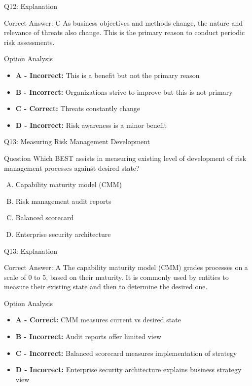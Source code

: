 \documentclass{beamer}
\begin{document}
	\begin{frame}{Q12: Explanation}
		\begin{block}{Correct Answer: C}
			As business objectives and methods change, the nature and relevance of threats also change. This is the primary reason to conduct periodic risk assessments.
		\end{block}
		\begin{block}{Option Analysis}
			\begin{itemize}
				\item \textbf{A - Incorrect:} This is a benefit but not the primary reason
				\item \textbf{B - Incorrect:} Organizations strive to improve but this is not primary
				\item \textbf{C - Correct:} Threats constantly change
				\item \textbf{D - Incorrect:} Risk awareness is a minor benefit
			\end{itemize}
		\end{block}
	\end{frame}
	
	\begin{frame}[shrink=10]{Q13: Measuring Risk Management Development}
		\begin{block}{Question}
			Which BEST assists in measuring existing level of development of risk management processes against desired state?
		\end{block}
		\begin{enumerate}[(A)]
			\item Capability maturity model (CMM)
			\item Risk management audit reports
			\item Balanced scorecard
			\item Enterprise security architecture
		\end{enumerate}
	\end{frame}
	
	\begin{frame}{Q13: Explanation}
		\begin{block}{Correct Answer: A}
			The capability maturity model (CMM) grades processes on a scale of 0 to 5, based on their maturity. It is commonly used by entities to measure their existing state and then to determine the desired one.
		\end{block}
		\begin{block}{Option Analysis}
			\begin{itemize}
				\item \textbf{A - Correct:} CMM measures current vs desired state
				\item \textbf{B - Incorrect:} Audit reports offer limited view
				\item \textbf{C - Incorrect:} Balanced scorecard measures implementation of strategy
				\item \textbf{D - Incorrect:} Enterprise security architecture explains business strategy view
			\end{itemize}
		\end{block}
	\end{frame}
	
\end{document}
